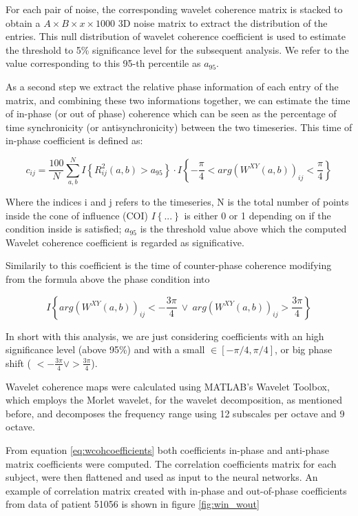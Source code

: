 \documentclass[a4paper,11pt]{article}
\begin{document}
For each pair of noise, the corresponding wavelet coherence matrix is stacked to obtain a $A\times B \times x \times 1000$ 3D noise matrix to extract the distribution of the entries.
This null distribution of wavelet coherence coefficient is used to estimate the threshold to 5\% significance level for the subsequent analysis.
We refer to the value corresponding to this 95-th percentile as $a_{95}$.


As a second step we extract the relative phase information of each entry of the matrix, and combining these two informations together, we can estimate the time of in-phase (or out of phase) coherence which can be seen as the percentage of time synchronicity (or antisynchronicity) between the two timeseries. \cite{bernas-2018}
This time of in-phase coefficient is defined as:

\begin{equation} \label{eq:wcohcoefficients}
c_{ij} = \frac{100}{N}\sum_{a, b}^N I\left\{ R_{ij}^2(a,b) > a_{95}\right\}\cdot I\left\{-\frac{\pi}{4}<arg(W^{XY}(a, b))_{ij} < \frac{\pi}{4}  \right\}
\end{equation}

Where the indices i and j refers to the timeseries, N is the total number of points inside the cone of influence (COI) $I\left\{ ...\right\}$ is either 0 or 1 depending on if the condition inside is satisfied; $a_{95}$ is the threshold value above which the computed Wavelet coherence coefficient is regarded as significative.

Similarily to this coefficient is the time of counter-phase coherence modifying from the formula above the phase condition into

\[
I\left\{arg(W^{XY}(a, b))_{ij} < -\frac{3\pi}{4} \ \lor \ arg (W^{XY}(a, b))_{ij} >\frac{3\pi}{4} \right\}
\]

In short with this analysis, we are just considering coefficients with an high significance level (above 95\%) and with a small $\in [-\pi/4, \pi/4]$, or big phase shift ( $< -\frac{3\pi}{4}  \lor  >\frac{3 \pi}{4}$).

Wavelet coherence maps were calculated using MATLAB's Wavelet Toolbox, which employs the Morlet wavelet, for the wavelet decomposition, as  mentioned before, and decomposes the frequency range using 12 subscales per octave and 9 octave.


From equation \ref{eq:wcohcoefficients} both coefficients in-phase and anti-phase matrix coefficients were computed.
The correlation coefficients matrix for each subject, were then flattened and used as input to the neural networks.
An example of correlation matrix created with in-phase and out-of-phase coefficients from data of patient 51056 is shown in figure \ref{fig:win_wout}
\end{document}
